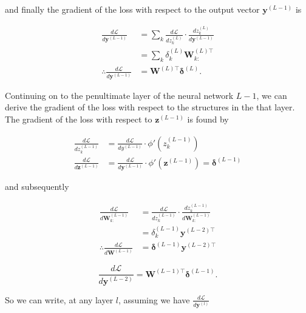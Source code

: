 \documentclass[10pt]{article}
\theoremstyle{definition}
\begin{document}
\noindent
and finally the gradient of the loss with respect to the output vector $\mathbf{y}^{(L-1)}$ is

\begin{equation*}
\begin{aligned}
\frac{d\mathcal{L}}{d\mathbf{y}^{(L-1)}} & = \sum\limits_k \frac{d\mathcal{L}}{dz^{(L)}_{k}} \cdot \frac{dz^{(L)}_{k}}{d\mathbf{y}^{(L-1)}} \\
& = \sum\limits_k \delta_k^{(L)} \mathbf{W}^{(L)\top}_{k:} \\
\therefore \frac{d\mathcal{L}}{d\mathbf{y}^{(L-1)}} & = \mathbf{W}^{(L)\top} \pmb{\delta}^{(L)}.
\end{aligned}
\end{equation*}

\noindent
Continuing on to the penultimate layer of the neural network $L-1$, we can derive the gradient of the loss with respect to the structures in the that layer. The gradient of the loss with respect to $\mathbf{z}^{(L-1)}$ is found by

\begin{equation*}
\begin{aligned}
\frac{d\mathcal{L}}{dz_k^{(L-1)}} & = \frac{d\mathcal{L}}{dy^{(L-1)}} \cdot \phi'(z_k^{(L-1)}) \\
\frac{d\mathcal{L}}{d\mathbf{z}^{(L-1)}} & = \frac{d\mathcal{L}}{d\mathbf{y}^{(L-1)}} \cdot \phi'(\mathbf{z}^{(L-1)}) = \pmb{\delta}^{(L-1)}
\end{aligned}
\end{equation*}

\noindent
and subsequently

\begin{equation*}
\begin{aligned}
\frac{d\mathcal{L}}{d\mathbf{W}^{(L-1)}_{k:}} & = \frac{d\mathcal{L}}{dz^{(L-1)}_{k}} \cdot \frac{dz^{(L-1)}_{k}}{d\mathbf{W}^{(L-1)}_{k:}} \\
& = \delta^{(L-1)}_{k}\mathbf{y}^{(L-2)\top} \\
\therefore \frac{d\mathcal{L}}{d\mathbf{W}^{(L-1)}} & = \pmb{\delta}^{(L-1)}\mathbf{y}^{(L-2)\top}
\end{aligned}
\end{equation*}

\begin{equation*}
\frac{d\mathcal{L}}{d\mathbf{y}^{(L-2)}} = \mathbf{W}^{(L-1)\top} \pmb{\delta}^{(L-1)}.
\end{equation*}

\noindent
So we can write, at any layer $l$, assuming we have $\frac{d\mathcal{L}}{d\mathbf{y}^{(l)}}$
\end{document}
